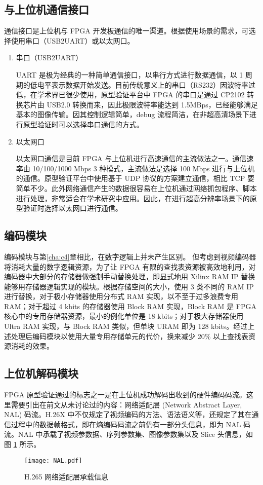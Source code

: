 \subsection{与上位机通信接口}
通信接口是上位机与 FPGA 开发板通信的唯一渠道。根据使用场景的需求，可选择使用串口（USB2UART）或以太网口。
\begin{enumerate}
    \item 串口（USB2UART）

          UART 是极为经典的一种简单通信接口，以串行方式进行数据通信，以 1 周期的低电平表示数据开始发送。目前传统意义上的串口（RS232）因波特率过低，在学术界已很少使用，原型验证平台中 FPGA 的串口是通过 CP2102 转换芯片由 USB2.0 转换而来，因此极限波特率能达到 1.5MBps，已经能够满足基本的图像传输。因其控制逻辑简单，debug 流程简洁，在非超高清场景下进行原型验证时可以选择串口通信的方式。

    \item 以太网口

          以太网口通信是目前 FPGA 与上位机进行高速通信的主流做法之一。通信速率由 10/100/1000 Mbps 3 种模式，主流做法是选择 100 Mbps 进行与上位机的通信。原型验证平台中使用基于 UDP 协议的方案建立通信，相比 TCP 要简单不少。此外网络通信产生的数据很容易在上位机通过网络抓包程序、脚本进行处理，非常适合在学术研究中应用。因此，在进行超高分辨率场景下的原型验证时选择以太网口进行通信。
\end{enumerate}

\subsection{编码模块}
编码模块与第\ref{cha:c4}章相比，在数字逻辑上并未产生区别。
但考虑到视频编码器将消耗大量的数字逻辑资源，为了让 FPGA 有限的查找表资源被高效地利用，对编码器中大部分的存储器做强制手动替换处理，即显式地用 Xilinx RAM IP 替换能够用存储器逻辑实现的模块。根据存储空间的大小，使用 3 类不同的 RAM IP 进行替换，对于极小存储器使用分布式 RAM 实现，以不至于过多浪费专用 RAM；对于超过 4 kbits 的存储器使用 Block RAM 实现，Block RAM 是 FPGA 核心中的专用存储器资源，最小的例化单位是 18 kbits；对于极大存储器使用 Ultra RAM 实现，与 Block RAM 类似，但单块 URAM 即为 128 kbits。经过上述处理后编码模块以使用大量专用存储单元的代价，换来减少 20\% 以上查找表资源消耗的效果。

\subsection{上位机解码模块}
FPGA 原型验证通过的标志之一是在上位机成功解码出收到的硬件编码码流。这里需要引出在前文从未讨论过的内容：网络适配层 (Network Abstract Layer, NAL) 码流。H.26X 中不仅规定了视频编码的方法、语法语义等，还规定了其在通信过程中的数据帧格式，即在熵编码码流之前仍有一部分头信息，即为 NAL 码流。NAL 中承载了视频参数据、序列参数集、图像参数集以及 Slice 头信息，如图 \ref{fig:NAL} 所示。
\begin{figure}[hbt]
    \centering
    \texttt{[image: NAL.pdf]}
    \caption{H.265 网络适配层承载信息}
    \label{fig:NAL}
\end{figure}

